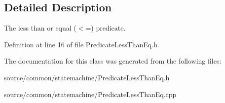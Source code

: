 \subsection{Detailed Description}
The less than or equal ($<$=) predicate. 

Definition at line 16 of file Predicate\-Less\-Than\-Eq.\-h.



The documentation for this class was generated from the following files\-:\begin{DoxyCompactItemize}
\item 
source/common/statemachine/Predicate\-Less\-Than\-Eq.\-h\item 
source/common/statemachine/Predicate\-Less\-Than\-Eq.\-cpp\end{DoxyCompactItemize}
